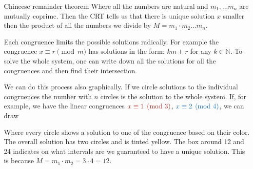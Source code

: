 \documentclass[final]{beamer}
\newlength{\colwidth}
\newcommand{\clr}{\textcolor{BrickRed}}
\newcommand{\clb}{\textcolor{RoyalBlue}}
\newcommand{\N}{\mathbb{N}}
\begin{document}
\begin{frame}[t]
\begin{columns}[t]
\begin{column}{\colwidth}
\begin{alertblock}{Chineese remainder theorem}
 Where all the numbers are natural and $m_1,\ldots m_n$ are mutually coprime.
 Then the CRT tells us that there is unique solution $x$ smaller then the product of
 all the numbers we divide by $M = m_1 \cdot m_2 \ldots m_n$.

Each congruence limits the possible solutions radically. For example the
congruence $x \equiv r \pmod{m}$ has solutions in the form: $km + r$ for any $k
\in \N$. To solve the whole system, one can write down all the solutions for
all the congruences and then find their intersection.

We can do this process also graphically. If we circle solutions to the
individual congruences the number with $n$ circles is the solution to the whole
system. If, for example, we have the linear congruences $\clr{x \equiv 1 \pmod{3}}$,
 $\clb{x \equiv 2 \pmod{4}}$, we can draw

\begin{center}
\end{center}
Where every circle shows a solution to one of the congruence based on their
color. The overall solution has two circles and is tinted yellow. The box
around 12 and 24 indicates on what intervals are we guaranteed to have a unique
solution. This is because $M=m_1 \cdot m_2 = 3 \cdot 4 = 12$.


\end{alertblock}
\end{column}
\end{columns}
\end{frame}
\end{document}

